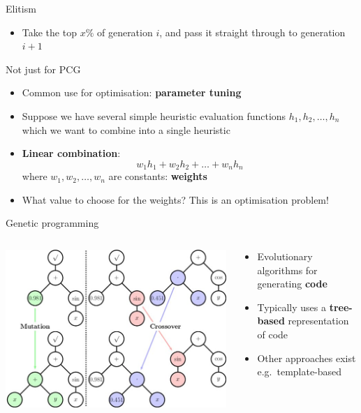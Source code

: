 \begin{frame}{Elitism}
	\begin{itemize}
		\pause\item Take the top $x\%$ of generation $i$, and pass it straight through to generation $i+1$
	\end{itemize}
\end{frame}

\begin{frame}{Not just for PCG}
	\begin{itemize}
		\pause\item Common use for optimisation: \textbf{parameter tuning}
		\pause\item Suppose we have several simple heuristic evaluation functions $h_1, h_2, \dots, h_n$
			which we want to combine into a single heuristic
		\pause\item \textbf{Linear combination}:
			$$ w_1 h_1 + w_2 h_2 + \dots + w_n h_n $$
			where $w_1, w_2, \dots, w_n$ are constants: \textbf{weights}
		\pause\item What value to choose for the weights? This is an optimisation problem!
	\end{itemize}
\end{frame}

\begin{frame}{Genetic programming}
    \begin{columns}
        \begin{column}{0.48\textwidth}
            \pause\includegraphics[width=\textwidth]{genetic_programming}
        \end{column}
        \begin{column}{0.48\textwidth}
            \begin{itemize}
                \pause\item Evolutionary algorithms for generating \textbf{code}
                \pause\item Typically uses a \textbf{tree-based} representation of code
                \pause\item Other approaches exist e.g.\ template-based
            \end{itemize}
        \end{column}
    \end{columns}
\end{frame}

